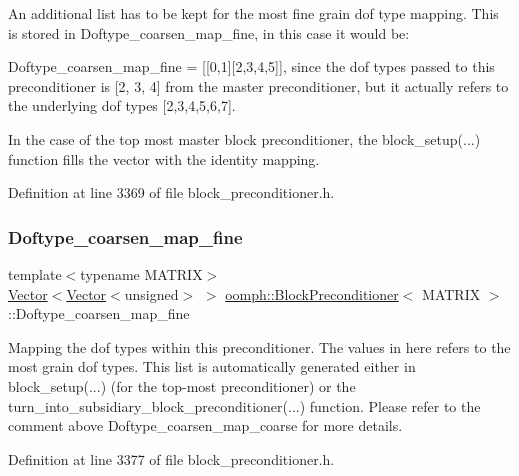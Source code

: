 An additional list has to be kept for the most fine grain dof type mapping. This is stored in Doftype\+\_\+coarsen\+\_\+map\+\_\+fine, in this case it would be\+:

Doftype\+\_\+coarsen\+\_\+map\+\_\+fine = \mbox{[}\mbox{[}0,1\mbox{]}\mbox{[}2,3,4,5\mbox{]}\mbox{]}, since the dof types passed to this preconditioner is \mbox{[}2, 3, 4\mbox{]} from the master preconditioner, but it actually refers to the underlying dof types \mbox{[}2,3,4,5,6,7\mbox{]}.

In the case of the top most master block preconditioner, the block\+\_\+setup(...) function fills the vector with the identity mapping. 

Definition at line 3369 of file block\+\_\+preconditioner.\+h.

\mbox{\label{classoomph_1_1BlockPreconditioner_aa4e2e47f537f9b6b4deae5792c493d65}} 
\subsubsection{\texorpdfstring{Doftype\+\_\+coarsen\+\_\+map\+\_\+fine}{Doftype\_coarsen\_map\_fine}}
{\footnotesize\ttfamily template$<$typename M\+A\+T\+R\+IX$>$ \\
\hyperlink{classoomph_1_1Vector}{Vector}$<$\hyperlink{classoomph_1_1Vector}{Vector}$<$unsigned$>$ $>$ \hyperlink{classoomph_1_1BlockPreconditioner}{oomph\+::\+Block\+Preconditioner}$<$ M\+A\+T\+R\+IX $>$\+::Doftype\+\_\+coarsen\+\_\+map\+\_\+fine\hspace{0.3cm}{\ttfamily [protected]}}



Mapping the dof types within this preconditioner. The values in here refers to the most grain dof types. This list is automatically generated either in block\+\_\+setup(...) (for the top-\/most preconditioner) or the turn\+\_\+into\+\_\+subsidiary\+\_\+block\+\_\+preconditioner(...) function. Please refer to the comment above Doftype\+\_\+coarsen\+\_\+map\+\_\+coarse for more details. 



Definition at line 3377 of file block\+\_\+preconditioner.\+h.

